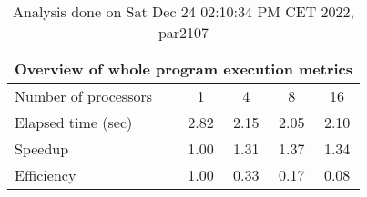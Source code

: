 \begin{table}[h]
\begin{center}
\begin{tabular}{|l|c|c|c|c|}
\hline
\multicolumn{5}{|c|}{Overview of whole program execution metrics} \\
\hline
\hline
Number of processors & 1 & 4 & 8 & 16 \\
\hline
Elapsed time (sec)      &       2.82 &       2.15 &       2.05 &       2.10 \\
\hline
Speedup                 &       1.00 &       1.31 &       1.37 &       1.34 \\
\hline
Efficiency              &       1.00 &       0.33 &       0.17 &       0.08 \\
\hline
\end{tabular}
\end{center}
\caption{ Analysis done on Sat Dec 24 02:10:34 PM CET 2022, par2107}
\end{table}
